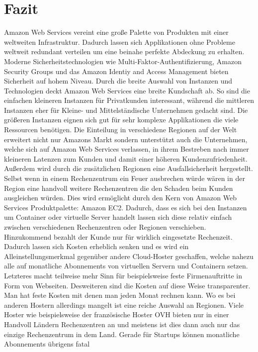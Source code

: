 \documentclass[titlepage]{report}
\begin{document}
\chapter*{Fazit}
Amazon Web Services vereint eine große Palette von Produkten mit einer
weltweiten Infrastruktur. Dadurch lassen sich Applikationen ohne
Probleme weltweit redundant verteilen um eine beinahe perfekte Abdeckung
zu erhalten. Moderne Sicherheitstechnologien wie
Multi\hyp{}Faktor\hyp{}Authentifizierung, Amazon Security Groups und das
Amazon Identiy and Access Management bieten Sicherheit auf hohem Niveau.
Durch die breite Auswahl von Instanzen und Technologien deckt Amazon Web
Services eine breite Kundschaft ab. So sind die einfachen kleineren
Instanzen für Privatkunden interessant, während die mittleren Instanzen
eher für Kleine\hyp{} und Mittelständische Unternehmen gedacht sind. Die
größeren Instanzen eignen sich gut für sehr komplexe Applikationen die
viele Ressourcen benötigen. Die Einteilung in verschiedene Regionen auf
der Welt erweitert nicht nur Amazons Markt sondern unterstützt auch die
Unternehmen, welche sich auf Amazon Web Services verlassen, in ihrem
Bestreben nach immer kleineren Latenzen zum Kunden und damit einer
höheren Kundenzufriedenheit. Außerdem wird durch die zusätzlichen
Regionen eine Ausfallsicherheit hergestellt. Selbst wenn in einem
Rechenzentrum ein Feuer ausbrechen würde wären in der Region eine
handvoll weitere Rechenzentren die den Schaden beim Kunden ausgleichen
würden. Dies wird ermöglicht durch den Kern von Amazon Web Services
Produktpalette: Amazon EC2. Dadurch, dass es sich bei den Instanzen um
Container oder virtuelle Server handelt lassen sich diese relativ
einfach zwischen verschiedenen Rechenzentren oder Regionen verschieben.
Hinzukommend bezahlt der Kunde nur für wirklich eingesetzte Rechenzeit.
Dadurch lassen sich Kosten erheblich senken und es wird ein
Alleinstellungsmerkmal gegenüber andere Cloud\hyp{}Hoster geschaffen,
welche nahezu alle auf monatliche Abonnements von virtuellen Servern und
Containern setzen. Letzteres macht teilweise mehr Sinn für
beispielsweise feste Firmenauftritte in Form von Webseiten. Desweiteren
sind die Kosten auf diese Weise transparenter. Man hat feste Kosten mit
denen man jeden Monat rechnen kann. Wo es bei anderen Hostern allerdings
mangelt ist eine reiche Auswahl an Regionen. Viele Hoster wie
beispielsweise der französische Hoster OVH bieten nur in einer Handvoll Ländern Rechenzentren an
und meistens ist dies dann auch nur das einzige Rechenzentrum in dem
Land. Gerade für Startups können monatliche Abonnements übrigens fatal
\end{document}
